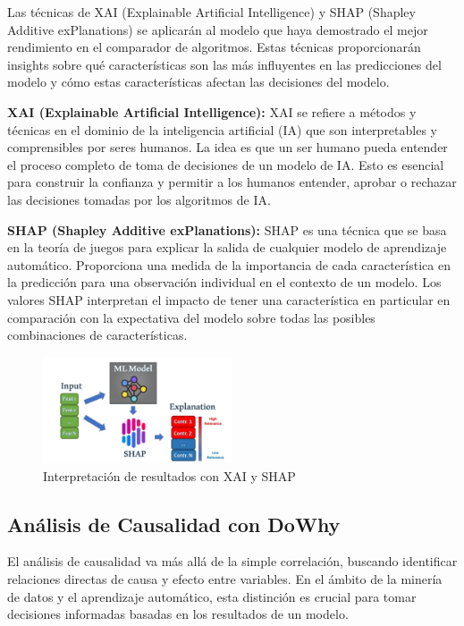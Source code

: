 Las técnicas de XAI (Explainable Artificial Intelligence) y SHAP (Shapley Additive exPlanations) se aplicarán al modelo que haya demostrado el mejor rendimiento en el comparador de algoritmos. Estas técnicas proporcionarán insights sobre qué características son las más influyentes en las predicciones del modelo y cómo estas características afectan las decisiones del modelo.

\textbf{XAI (Explainable Artificial Intelligence):} XAI se refiere a métodos y técnicas en el dominio de la inteligencia artificial (IA) que son interpretables y comprensibles por seres humanos. La idea es que un ser humano pueda entender el proceso completo de toma de decisiones de un modelo de IA. Esto es esencial para construir la confianza y permitir a los humanos entender, aprobar o rechazar las decisiones tomadas por los algoritmos de IA.

\textbf{SHAP (Shapley Additive exPlanations):} SHAP es una técnica que se basa en la teoría de juegos para explicar la salida de cualquier modelo de aprendizaje automático. Proporciona una medida de la importancia de cada característica en la predicción para una observación individual en el contexto de un modelo. Los valores SHAP interpretan el impacto de tener una característica en particular en comparación con la expectativa del modelo sobre todas las posibles combinaciones de características.

\begin{figure}[H]
  \centering
  \includegraphics[width=0.5\textwidth]{img/xai_shap.jpg}
  \caption{Interpretación de resultados con XAI y SHAP}
  \label{fig:xai_shap}
\end{figure}


\subsection{Análisis de Causalidad con DoWhy}

El análisis de causalidad va más allá de la simple correlación, buscando identificar relaciones directas de causa y efecto entre variables. En el ámbito de la minería de datos y el aprendizaje automático, esta distinción es crucial para tomar decisiones informadas basadas en los resultados de un modelo.

